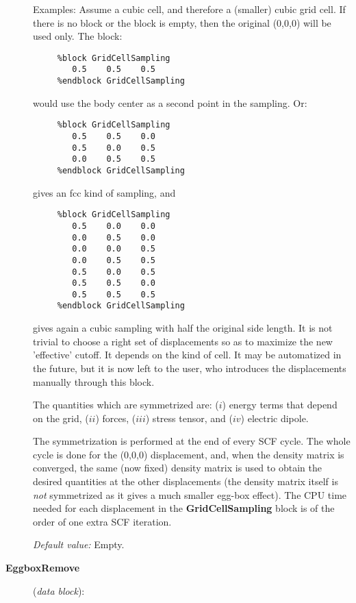 \documentclass[11pt]{article}
\begin{document}
\begin{description}
Examples: Assume a cubic cell, and therefore a (smaller) cubic grid cell.
If there is no block or the block is empty, then the original (0,0,0)
will be used only. The block:

\begin{verbatim}
     %block GridCellSampling
        0.5    0.5    0.5
     %endblock GridCellSampling
\end{verbatim}

would use the body center as a second point in the sampling. Or:


\begin{verbatim}
     %block GridCellSampling
        0.5    0.5    0.0
        0.5    0.0    0.5
        0.0    0.5    0.5
     %endblock GridCellSampling
\end{verbatim}

gives an fcc kind of sampling, and

\begin{verbatim}
     %block GridCellSampling
        0.5    0.0    0.0
        0.0    0.5    0.0
        0.0    0.0    0.5
        0.0    0.5    0.5
        0.5    0.0    0.5
        0.5    0.5    0.0
        0.5    0.5    0.5
     %endblock GridCellSampling
\end{verbatim}

gives again a cubic sampling with half the original side length.
It is not trivial to choose a right set of displacements so as
to maximize the new 'effective' cutoff. It depends on the
kind of cell. It may be automatized in the future, but it
is now left to the user, who introduces the displacements
manually through this block.

The quantities which are symmetrized are: ($i$) energy terms
that depend on the grid, ($ii$) forces, ($iii$) stress
tensor, and ($iv$) electric dipole.

The symmetrization is performed at the end of every SCF cycle. The
whole cycle is done for the (0,0,0) displacement, and, when the
density matrix is converged, the same (now fixed)
density matrix is used to obtain the desired quantities at the
other displacements (the density matrix itself is {\it not}
symmetrized as it gives a much smaller egg-box effect).
The CPU time needed for each displacement
in the {\bf GridCellSampling} block
is of the order of one extra SCF iteration.

{\it Default value:} Empty.


\item[{\bf EggboxRemove}] ({\it data block}):


\end{description}
\end{document}
